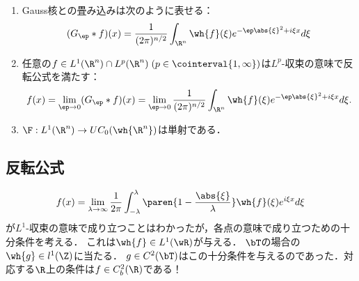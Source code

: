\documentclass[uplatex,dvipdfmx]{jsreport}
\begin{document}
\begin{proposition}\mbox{}
    \begin{enumerate}
        \item Gauss核との畳み込みは次のように表せる：
        \[(G_\ep*f)(x)=\frac{1}{(2\pi)^{n/2}}\int_{\R^n}\wh{f}(\xi)e^{-\ep\abs{\xi}^2+i\xi x}d\xi\]
        \item 任意の$f\in L^1(\R^n)\cap L^p(\R^n)\;(p\in\cointerval{1,\infty})$は$L^p$-収束の意味で反転公式を満たす：
        \[f(x)=\lim_{\ep\to0}(G_\ep*f)(x)=\lim_{\ep\to0}\frac{1}{(2\pi)^{n/2}}\int_{\R^n}\wh{f}(\xi)e^{-\ep\abs{\xi}^2+i\xi x}d\xi.\]
        \item $\F:L^1(\R^n)\to UC_0(\wh{\R^n})$は単射である．
    \end{enumerate}
\end{proposition}

\subsection{反転公式}

\begin{tcolorbox}[colframe=ForestGreen, colback=ForestGreen!10!white,breakable,colbacktitle=ForestGreen!40!white,coltitle=black,fonttitle=\bfseries\sffamily,
title=]
    \[f(x)=\lim_{\lambda\to\infty}\frac{1}{2\pi}\int^\lambda_{-\lambda}\paren{1-\frac{\abs{\xi}}{\lambda}}\wh{f}(\xi)e^{i\xi x}d\xi\]
    が$L^1$-収束の意味で成り立つことはわかったが，各点の意味で成り立つための十分条件を考える．
    これは$\wh{f}\in L^1(\wR)$が与える．
    $\bT$の場合の$\wh{g}\in l^1(\Z)$に当たる．
    $g\in C^2(\bT)$はこの十分条件を与えるのであった．対応する$\R$上の条件は$f\in C^2_b(\R)$である！
\end{tcolorbox}
\end{document}

